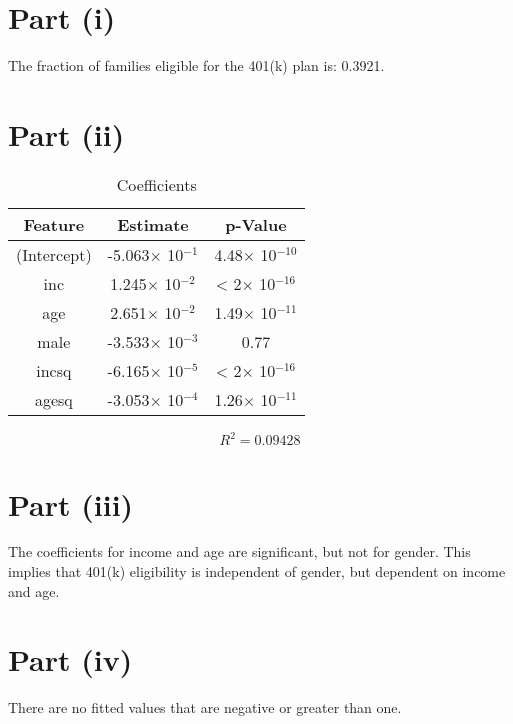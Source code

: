 \documentclass{./solution}
\begin{document}
    \begin{solution}[Wooldridge C7.9]
        \section*{Part (i)}
            The fraction of families eligible for the 401(k) plan is: 0.3921.

        \section*{Part (ii)}
            \begin{table}[H]
                \caption{Coefficients}
                \begin{tabularx}{\textwidth}{C C C}
                    \toprule
                    Feature & Estimate & p-Value \\
                    \midrule
                    (Intercept) & -5.063$\times$ 10$^{-1}$ &  4.48$\times$ 10$^{-10}$ \\
                    inc         &  1.245$\times$ 10$^{-2}$ &   < 2$\times$ 10$^{-16}$ \\
                    age         &  2.651$\times$ 10$^{-2}$ &  1.49$\times$ 10$^{-11}$ \\
                    male        & -3.533$\times$ 10$^{-3}$ &      0.77 \\
                    incsq       & -6.165$\times$ 10$^{-5}$ &   < 2$\times$ 10$^{-16}$ \\
                    agesq       & -3.053$\times$ 10$^{-4}$ &  1.26$\times$ 10$^{-11}$ \\
                    \bottomrule
                \end{tabularx}
            \end{table}
            \vspace{-5mm}
            $$ R^2 = 0.09428 $$

        \section*{Part (iii)}
            The coefficients for income and age are significant, but not for gender.
            This implies that 401(k) eligibility is independent of gender, but dependent on income and age.

        \section*{Part (iv)}
            There are no fitted values that are negative or greater than one.


\end{solution}
\end{document}

